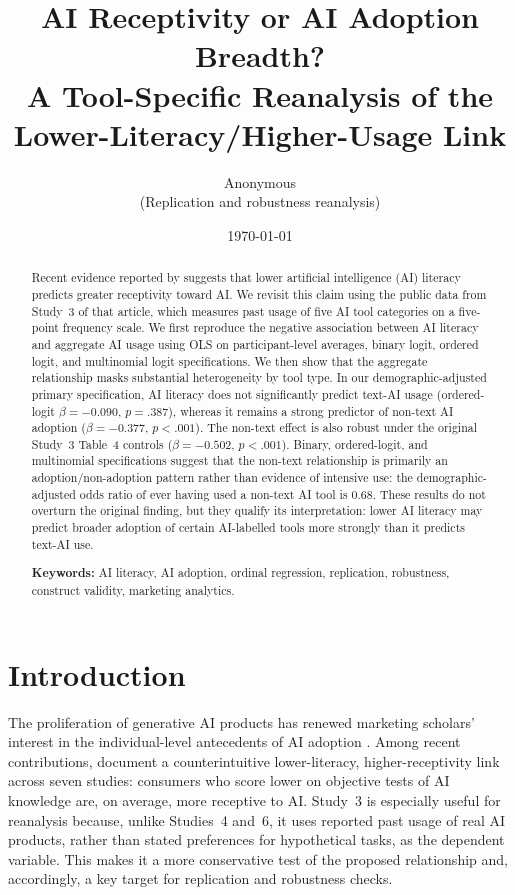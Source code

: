 \documentclass[11pt]{article}
\title{\vspace{-2em}AI Receptivity or AI Adoption Breadth?\\
A Tool-Specific Reanalysis of the\\ Lower-Literacy/Higher-Usage Link}
\author{Anonymous \\ \small (Replication and robustness reanalysis)}
\date{\today}
\begin{document}
\maketitle

\begin{abstract}
\noindent
Recent evidence reported by \citet{tully2025lower} suggests that lower artificial
intelligence (AI) literacy predicts greater receptivity toward AI. We revisit this
claim using the public data from Study~3 of that article, which measures past
usage of five AI tool categories on a five-point frequency scale. We first
reproduce the negative association between AI literacy and aggregate AI usage
using OLS on participant-level averages, binary logit, ordered logit, and
multinomial logit specifications. We then show that the aggregate relationship
masks substantial heterogeneity by tool type. In our demographic-adjusted
primary specification, AI literacy does not significantly predict text-AI usage
(ordered-logit $\beta = -0.090$, $p = .387$), whereas it remains a strong
predictor of non-text AI adoption ($\beta = -0.377$, $p < .001$). The non-text
effect is also robust under the original Study~3 Table~4 controls
($\beta = -0.502$, $p < .001$). Binary, ordered-logit, and multinomial
specifications suggest that the non-text relationship is primarily an
adoption/non-adoption pattern rather than evidence of intensive use: the
demographic-adjusted odds ratio of ever having used a non-text AI tool is
$0.68$. These results do not overturn the original finding, but they qualify
its interpretation: lower AI literacy may predict broader adoption of certain
AI-labelled tools more strongly than it predicts text-AI use.

\medskip
\noindent\textbf{Keywords:} AI literacy, AI adoption, ordinal regression,
replication, robustness, construct validity, marketing analytics.
\end{abstract}

\section{Introduction}

The proliferation of generative AI products has renewed marketing scholars'
interest in the individual-level antecedents of AI adoption
\citep{puntoni2021consumers,hermann2024aiconsumer}. Among recent contributions,
\citet{tully2025lower} document a counterintuitive lower-literacy, higher-receptivity
link across seven studies: consumers who score lower on objective tests of AI
knowledge are, on average, more receptive to AI. Study~3 is especially useful
for reanalysis because, unlike Studies~4
and~6, it uses reported past usage of real AI products, rather than stated
preferences for hypothetical tasks, as the dependent variable. This makes it a
more conservative test of the proposed relationship and, accordingly, a key
target for replication and robustness checks.
\end{document}
